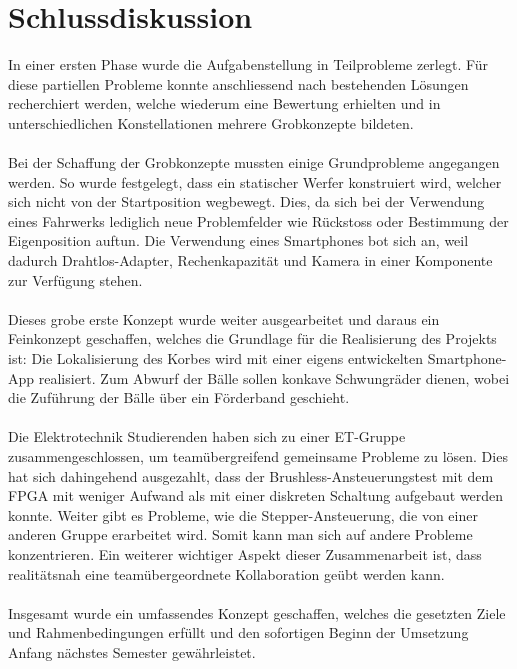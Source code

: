 \section{Schlussdiskussion}
In einer ersten Phase wurde die Aufgabenstellung in Teilprobleme zerlegt. Für diese partiellen 
Probleme konnte anschliessend nach bestehenden Lösungen recherchiert werden, welche wiederum 
eine Bewertung erhielten und in unterschiedlichen Konstellationen mehrere Grobkonzepte bildeten.\\
\\
Bei der Schaffung der Grobkonzepte mussten einige Grundprobleme angegangen werden. So wurde 
festgelegt, dass ein statischer Werfer konstruiert wird, welcher sich nicht von der Startposition 
wegbewegt. Dies, da sich bei der Verwendung eines Fahrwerks lediglich neue Problemfelder wie 
Rückstoss oder Bestimmung der Eigenposition auftun. Die Verwendung eines Smartphones bot sich 
an, weil dadurch Drahtlos-Adapter, Rechenkapazität und Kamera in einer Komponente zur Verfügung 
stehen. \\
\\
Dieses grobe erste Konzept wurde weiter ausgearbeitet und daraus ein Feinkonzept geschaffen, 
welches die Grundlage für die Realisierung des Projekts ist: Die Lokalisierung des Korbes wird 
mit einer eigens entwickelten Smartphone-App realisiert. Zum Abwurf der Bälle sollen konkave 
Schwungräder dienen, wobei die Zuführung der Bälle über ein Förderband 
geschieht. \\
\\
Die Elektrotechnik Studierenden haben sich zu einer ET-Gruppe zusammengeschlossen, um 
teamübergreifend gemeinsame Probleme zu lösen. Dies hat sich dahingehend ausgezahlt, dass 
der Brushless-Ansteuerungstest mit dem FPGA mit weniger Aufwand als mit einer diskreten Schaltung 
aufgebaut werden konnte. Weiter gibt es Probleme, wie die Stepper-Ansteuerung, die von einer anderen 
Gruppe erarbeitet wird. Somit kann man sich auf andere Probleme konzentrieren. Ein weiterer wichtiger 
Aspekt dieser Zusammenarbeit ist, dass realitätsnah eine teamübergeordnete Kollaboration geübt werden 
kann.\\
\\
Insgesamt wurde ein umfassendes Konzept geschaffen, welches die gesetzten Ziele und 
Rahmenbedingungen erfüllt und den sofortigen Beginn der Umsetzung Anfang nächstes Semester 
gewährleistet.